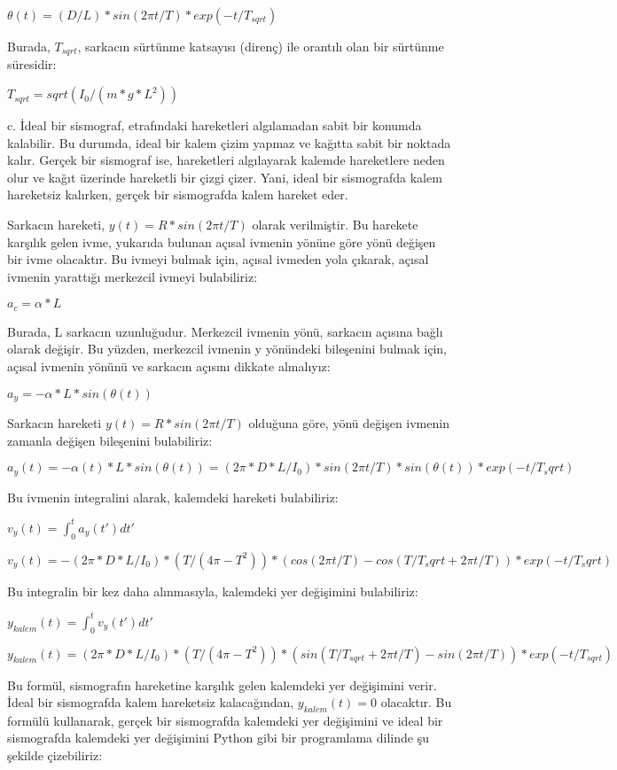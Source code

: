 \documentclass[12pt]{article}
\begin{document}
$\theta(t) = (D / L) * sin(2\pi t / T) * exp(-t / T_{sqrt})$

Burada, $T_{sqrt}$, sarkacın sürtünme katsayısı (direnç) ile orantılı olan bir sürtünme süresidir:

$T_{sqrt} = sqrt(I_0 / (m * g * L^2))$

c. İdeal bir sismograf, etrafındaki hareketleri algılamadan sabit bir konumda kalabilir. Bu durumda, ideal bir kalem çizim yapmaz ve kağıtta sabit bir noktada kalır. Gerçek bir sismograf ise, hareketleri algılayarak kalemde hareketlere neden olur ve kağıt üzerinde hareketli bir çizgi çizer. Yani, ideal bir sismografda kalem hareketsiz kalırken, gerçek bir sismografda kalem hareket eder.

Sarkacın hareketi, $y(t) = R * sin(2\pi t / T)$ olarak verilmiştir. Bu harekete karşılık gelen ivme, yukarıda bulunan açısal ivmenin yönüne göre yönü değişen bir ivme olacaktır. Bu ivmeyi bulmak için, açısal ivmeden yola çıkarak, açısal ivmenin yarattığı merkezcil ivmeyi bulabiliriz:

$a_c = \alpha * L$

Burada, L sarkacın uzunluğudur. Merkezcil ivmenin yönü, sarkacın açısına bağlı olarak değişir. Bu yüzden, merkezcil ivmenin y yönündeki bileşenini bulmak için, açısal ivmenin yönünü ve sarkacın açısını dikkate almalıyız:

$a_y = -\alpha * L * sin(\theta(t))$

Sarkacın hareketi $y(t) = R * sin(2\pi t / T)$ olduğuna göre, yönü değişen ivmenin zamanla değişen bileşenini bulabiliriz:

$a_y(t) = -\alpha(t) * L * sin(\theta(t)) = (2\pi * D * L / I_0) * sin(2\pi t / T) * sin(\theta(t)) * exp(-t / T_sqrt)$

Bu ivmenin integralini alarak, kalemdeki hareketi bulabiliriz:

$v_y(t) = \int_0^t a_y(t') dt'$

$v_y(t) = -(2\pi * D * L / I_0) * (T / (4\pi - T^2)) * (cos(2\pi t / T) - cos(T / T_sqrt + 2\pi t / T)) * exp(-t / T_sqrt)$

Bu integralin bir kez daha alınmasıyla, kalemdeki yer değişimini bulabiliriz:

$y_{kalem}(t) = \int_0^t v_y(t') dt'$

$y_{kalem}(t) = (2\pi * D * L / I_0) * (T / (4\pi - T^2)) * (sin(T / T_{sqrt} + 2\pi t / T) - sin(2\pi t / T)) * exp(-t / T_{sqrt})$

Bu formül, sismografın hareketine karşılık gelen kalemdeki yer değişimini verir. İdeal bir sismografda kalem hareketsiz kalacağından, $y_{kalem}(t) = 0$ olacaktır. Bu formülü kullanarak, gerçek bir sismografda kalemdeki yer değişimini ve ideal bir sismografda kalemdeki yer değişimini Python gibi bir programlama dilinde şu şekilde çizebiliriz:
\end{document}
